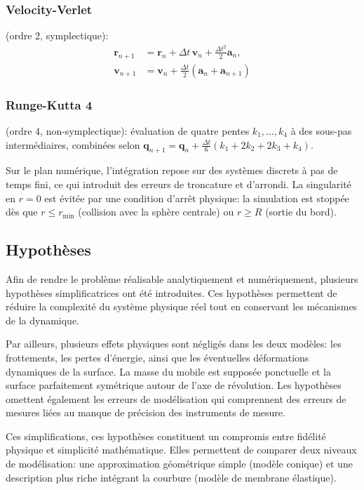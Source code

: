 \documentclass[
	a4paper, %
	10pt, %
	unnumberedsections, %
	twoside, %
]{LTJournalArticle}
\begin{document}
\subsubsection{Velocity-Verlet} (ordre 2, symplectique):
\begin{align*}
	\mathbf{r}_{n+1} &= \mathbf{r}_n + \Delta t\,\mathbf{v}_n
	                    + \tfrac{\Delta t^2}{2}\mathbf{a}_n, \\
	\mathbf{v}_{n+1} &= \mathbf{v}_n
	                    + \tfrac{\Delta t}{2}(\mathbf{a}_n+\mathbf{a}_{n+1})
\end{align*}

\subsubsection{Runge-Kutta 4} (ordre 4, non-symplectique): évaluation de quatre
pentes $k_1,\ldots,k_4$ à des sous-pas intermédiaires, combinées selon
$\mathbf{q}_{n+1} = \mathbf{q}_n + \tfrac{\Delta t}{6}(k_1+2k_2+2k_3+k_4)$.

Sur le plan numérique, l'intégration repose sur des systèmes discrets à
pas de temps fini, ce qui introduit des erreurs de troncature et d'arrondi.
La singularité en $r=0$ est évitée par une condition d'arrêt physique:
la simulation est stoppée dès que $r \leq r_{\min}$ (collision avec la
sphère centrale) ou $r \geq R$ (sortie du bord).

\subsection{Hypothèses}
Afin de rendre le problème réalisable analytiquement et numériquement, plusieurs
hypothèses simplificatrices ont été introduites. Ces hypothèses permettent de
réduire la complexité du système physique réel tout en conservant les mécanismes de la dynamique.

Par ailleurs, plusieurs effets physiques sont négligés dans les deux modèles:
les frottements, les pertes d’énergie, ainsi que les éventuelles déformations
dynamiques de la surface. La masse du mobile est supposée ponctuelle et la
surface parfaitement symétrique autour de l'axe de révolution. Les hypothèses omettent
également les erreurs de modélisation qui comprennent des erreurs de mesures liées
au manque de précision des instruments de mesure.

Ces simplifications, ces hypothèses constituent un compromis entre fidélité physique et simplicité
mathématique. Elles permettent de comparer deux niveaux de modélisation: une
approximation géométrique simple (modèle conique) et une description plus riche
intégrant la courbure (modèle de membrane élastique).
\end{document}
